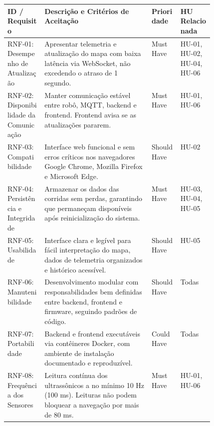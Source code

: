 \begin{table}[H]
    \centering
    \small
    \renewcommand{\arraystretch}{1.3}
    \begin{tabularx}{\linewidth}{|>{\raggedright\arraybackslash}p{0.18\linewidth}|X|>{\centering\arraybackslash}p{0.14\linewidth}|>{\centering\arraybackslash}p{0.16\linewidth}|}
        \hline
        \textbf{ID / Requisito} & \textbf{Descrição e Critérios de Aceitação} & \textbf{Prioridade} & \textbf{HU Relacionada} \\ \hline
        
        RNF-01: Desempenho de Atualização & Apresentar telemetria e atualização do mapa com baixa latência via WebSocket, não excedendo o atraso de 1 segundo. & Must Have & HU-01, HU-02, HU-04, HU-06 \\ \hline
        
        RNF-02: Disponibilidade da Comunicação & Manter comunicação estável entre robô, MQTT, backend e frontend. Frontend avisa se as atualizações pararem. & Must Have & HU-01, HU-06 \\ \hline
        
        RNF-03: Compatibilidade & Interface web funcional e sem erros críticos nos navegadores Google Chrome, Mozilla Firefox e Microsoft Edge. & Should Have & HU-02 \\ \hline
        
        RNF-04: Persistência e Integridade & Armazenar os dados das corridas sem perdas, garantindo que permaneçam disponíveis após reinicialização do sistema. & Must Have & HU-03, HU-04, HU-05 \\ \hline
        
        RNF-05: Usabilidade & Interface clara e legível para fácil interpretação do mapa, dados de telemetria organizados e histórico acessível. & Should Have & HU-05 \\ \hline
        
        RNF-06: Manutenibilidade & Desenvolvimento modular com responsabilidades bem definidas entre backend, frontend e firmware, seguindo padrões de código. & Should Have & Todas \\ \hline
        
        RNF-07: Portabilidade & Backend e frontend executáveis via contêineres Docker, com ambiente de instalação documentado e reproduzível. & Could Have & Todas \\ \hline
        
        RNF-08: Frequência dos Sensores & Leitura contínua dos ultrassônicos a no mínimo 10 Hz (100 ms). Leituras não podem bloquear a navegação por mais de 80 ms. & Must Have & HU-01, HU-06 \\ \hline
        

\end{tabularx}
\end{table}
